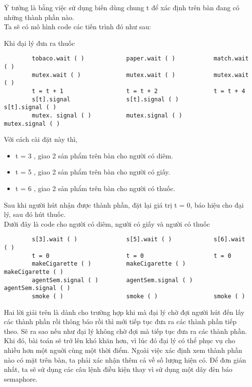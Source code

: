 \documentclass[a4paper]{article}
\begin{document}
	Ý tưởng là bằng việc sử dụng biến dùng chung t để xác định trên bàn đang có những thành phần nào. \\
	Ta sẽ có mô hình code các tiến trình đó như sau: 
	\begin{center}
		Khi đại lý đưa ra thuốc
		\begin{tcolorbox}
		\begin{verbatim}
		tobaco.wait ( )            paper.wait ( )           match.wait ( )
		mutex.wait ( )             mutex.wait ( )           mutex.wait ( )
		t = t + 1                  t = t + 2                t = t + 4
		s[t].signal                s[t].signal ( )          s[t].signal ( )
		mutex. signal ( )          mutex.signal ( )         mutex.signal ( )
		\end{verbatim}
		\end{tcolorbox}
	\end{center}
	Với cách cài đặt này thì, 
	\begin{itemize}
		\item t = 3 , giao 2 sản phẩm trên bàn cho người có diêm.
		\item t = 5 , giao 2 sản phẩm trên bàn cho người có giấy.
		\item t = 6 , giao 2 sản phẩm trên bàn cho người có thuốc.
	\end{itemize}
	Sau khi người hút nhận được thành phần, đặt lại giá trị t = 0, báo hiệu cho đại lý, sau đó hút thuốc.\\[5mm]
	Dưới đây là code cho người có diêm, người có giấy và người có thuốc
	\begin{tcolorbox}
		\begin{verbatim}
		s[3].wait ( )              s[5].wait ( )            s[6].wait ( )
		t = 0                      t = 0                    t = 0
		makeCigarette ( )          makeCigarette ( )        makeCigarette ( )
		agentSem.signal ( )        agentSem.signal ( )      agentSem.signal ( )
		smoke ( )                  smoke ( )                smoke ( )       
		\end{verbatim}
	\end{tcolorbox}
	
	
	
	Hai lời giải trên là dành cho trường hợp khi mà đại lý chờ đợi người hút đến lấy các thành phần rồi thông báo rồi
	thì mới tiếp tục đưa ra các thành phần tiếp theo. Sẽ ra sao nếu như đại lý không chờ đợi mà tiếp tục đưa 
	ra các thành phần. \\
	Khi đó, bài toán sẽ trở lên khó khăn hơn, vì lúc đó đại lý có thể phục vụ cho nhiều hơn một nguời cùng một
	thời điểm. Ngoài việc xác định xem thành phần nào có mặt trên bàn, ta phải xác nhận thêm cả về số
	lượng hiện có. Để đơn giản nhất, ta sẽ sử dụng các câu lệnh điều kiện thay vì sử dụng một dãy đèn báo semaphore. 
\end{document}
